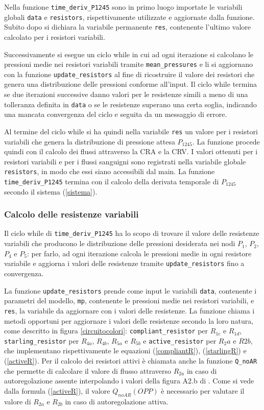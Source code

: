 \documentclass{article}
\begin{document}
Nella funzione \texttt{time\_deriv\_P1245} sono in primo luogo importate le variabili globali \texttt{data} e \texttt{resistors}, rispettivamente utilizzate e aggiornate dalla funzione.
Subito dopo si dichiara la variabile permanente \texttt{res}, contenente l'ultimo valore calcolato per i resistori variabili.

Successivamente si esegue un ciclo while in cui ad ogni iterazione si calcolano le pressioni medie nei resistori variabili tramite \texttt{mean\_pressures} e li si aggiornano con la funzione \texttt{update\_resistors} al fine di ricostruire il valore dei resistori che genera una distribuzione delle pressioni conforme all'input.
Il ciclo while termina se due iterazioni successive danno valori per le resistenze simili a meno di una tolleranza definita in \texttt{data} o se le resistenze superano una certa soglia, indicando una mancata convergenza del ciclo e seguita da un messaggio di errore.

Al termine del ciclo while si ha quindi nella variabile \texttt{res} un valore per i resistori variabili che genera la distribuzione di pressione attesa $P_{1245}$.
La funzione procede quindi con il calcolo dei flussi attraverso la CRA e la CRV.
I valori ottenuti per i resistori variabili e per i flussi sanguigni sono registrati nella variabile globale \texttt{resistors}, in modo che essi siano accessibili dal main.
La funzione \texttt{time\_deriv\_P1245} termina con il calcolo della derivata temporale di $P_{1245}$ secondo il sistema (\ref{sistema}).

\subsubsection*{Calcolo delle resistenze variabili}
Il ciclo while di \texttt{time\_deriv\_P1245} ha lo scopo di trovare il valore delle resistenze variabili che producono le distribuzione delle pressioni desiderata nei nodi $P_1$, $P_2$, $P_4$ e $P_5$: per farlo, ad ogni iterazione calcola le pressioni medie in ogni resistore variabile e aggiorna i valori delle resistenze tramite \texttt{update\_resistors} fino a convergenza.

La funzione \texttt{update\_resistors} prende come input le variabili \texttt{data}, contenente i parametri del modello, \texttt{mp}, contenente le pressioni medie nei resistori variabili, e \texttt{res}, la variabile da aggiornare con i valori delle resistenze.
La funzione chiama i metodi opportuni per aggiornare i valori delle resistenze secondo la loro natura, come descritto in figura \ref{circuitocolori}: \texttt{compliant\_resistor} per $R_{1c}$ e $R_{1d}$, \texttt{starling\_resistor} per $R_{4a}$, $R_{4b}$, $R_{5a}$ e $R_{5b}$ e \texttt{active\_resistor} per $R_2a$ e $R2b$, che implementano rispettivamente le equazioni (\ref{compliantR}), (\ref{starlingR}) e (\ref{activeR}).
Per il calcolo dei resistori attivi è chiamata anche la funzione \texttt{Q\_noAR} che permette di calcolare il valore di flusso attraverso $R_{2a}$ in caso di autoregolazione assente interpolando i valori della figura A2.b di \citep{art1}.
Come si vede dalla formula (\ref{activeR}), il valore $Q_{noAR}(OPP)$ è necessario per valutare il valore di $R_{2a}$ e $R_{2b}$ in caso di autoregolazione attiva.
\end{document}

